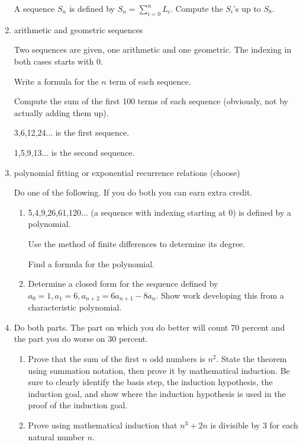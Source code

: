 \documentclass[12pt]{article}
\begin{document}
\begin{enumerate}
A sequence $S_n$ is defined by $S_n = \sum_{i=0}^n L_i$.  Compute the $S_i$'s up to $S_8$.

\newpage

\item  arithmetic and geometric sequences

Two sequences are given, one arithmetic and one geometric.  The indexing in both cases starts with 0.

Write a formula for the $n$ term of each sequence.

Compute the sum of the first 100 terms of each sequence (obviously, not by actually adding them up).

3,6,12,24$\ldots$ is the first sequence.

1,5,9,13$\ldots$ is the second sequence.

\newpage

\item  polynomial fitting or exponential recurrence relations (choose)

Do one of the following.  If you do both you can earn extra credit.

\begin{enumerate}

\item 5,4,9,26,61,120$\ldots$ (a sequence with indexing starting at 0) is defined by a polynomial.  

Use the method of finite differences to determine its degree.

Find a formula for the polynomial.

\item  Determine a closed form for the sequence defined by $a_0 =1, a_1=6, a_{n+2}=6a_{n+1}-8a_n$.  Show work developing this from a characteristic polynomial.

\end{enumerate}

\newpage

\item   Do both parts.  The part on which you do better will count 70 percent and the part you do worse on 30 percent.

\begin{enumerate}

\item  Prove that the sum of the first $n$ odd numbers is $n^2$.  State the theorem using summation notation, then prove it by mathematical induction.
Be sure to clearly identify the basis step, the induction hypothesis, the induction goal, and show where the induction hypothesis is used in the proof of the induction goal.


\item  Prove using mathematical induction that $n^3 + 2n$ is divisible by 3 for each natural number $n$.

\end{enumerate}

\newpage



\end{enumerate}
\end{document}
